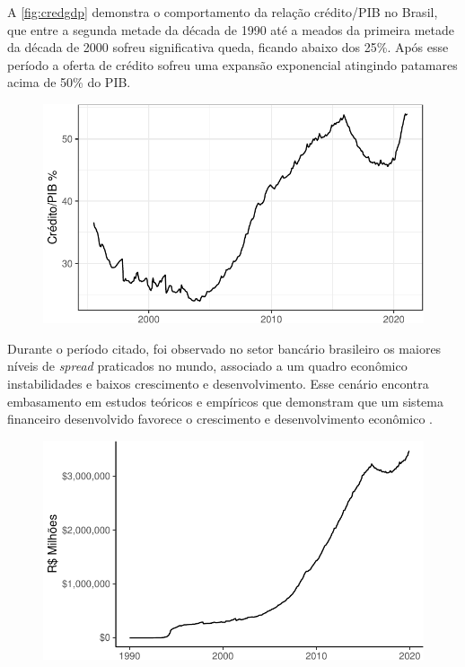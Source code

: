 \documentclass[12pt,12pt,openright,oneside,a4paper,chapter=TITLE,section=TITLE,subsection=TITLE,subsubsection=TITLE,english,french,spanish,portugues,sumario=tradicional]{abntex2}
\begin{document}
A \autoref{fig:credgdp} demonstra o comportamento da relação crédito/PIB no
Brasil, que entre a segunda metade da década de 1990 até a meados da primeira
metade da década de 2000 sofreu significativa queda, ficando abaixo dos 25\%.
Após esse período a oferta de crédito sofreu uma expansão exponencial atingindo
patamares acima de 50\% do PIB.

\begin{figure}

\begin{center}\includegraphics{12-exportedfigures/credit gdp-1} \end{center}
\label{fig:credgdp}
\end{figure}

Durante o período citado, foi observado no setor bancário brasileiro os maiores
níveis de \emph{spread} praticados no mundo, associado a um quadro econômico
instabilidades e baixos crescimento e desenvolvimento. Esse cenário encontra
embasamento em estudos teóricos e empíricos que demonstram que um sistema
financeiro desenvolvido favorece o crescimento e desenvolvimento econômico
\cite{levine:1997, matos:2003}.

\begin{figure}

\begin{center}\includegraphics{12-exportedfigures/balance credit-1} \end{center}
\label{fig:saldocredito}
\end{figure}
\end{document}
